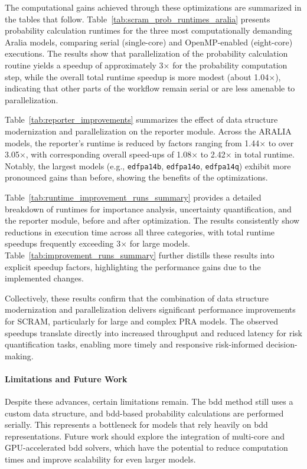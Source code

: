 The computational gains achieved through these optimizations are summarized in the tables that follow. Table~\ref{tab:scram_prob_runtimes_aralia} presents probability calculation runtimes for the three most computationally demanding Aralia models, comparing serial (single-core) and OpenMP-enabled (eight-core) executions. The results show that parallelization of the probability calculation routine yields a speedup of approximately 3$\times$ for the probability computation step, while the overall total runtime speedup is more modest (about 1.04$\times$), indicating that other parts of the workflow remain serial or are less amenable to parallelization.



Table~\ref{tab:reporter_improvements} summarizes the effect of data structure modernization and parallelization on the reporter module. Across the ARALIA models, the reporter's runtime is reduced by factors ranging from 1.44$\times$ to over 3.05$\times$, with corresponding overall speed-ups of 1.08$\times$ to 2.42$\times$ in total runtime. Notably, the largest models (e.g., \texttt{edfpa14b}, \texttt{edfpa14o}, \texttt{edfpa14q}) exhibit more pronounced gains than before, showing the benefits of the optimizations.



Table~\ref{tab:runtime_improvement_runs_summary} provides a detailed breakdown of runtimes for importance analysis, uncertainty quantification, and the reporter module, before and after optimization. The results consistently show reductions in execution time across all three categories, with total runtime speedups frequently exceeding 3$\times$ for large models. Table~\ref{tab:improvement_runs_summary} further distills these results into explicit speedup factors, highlighting the performance gains due to the implemented changes.



Collectively, these results confirm that the combination of data structure modernization and parallelization delivers significant performance improvements for SCRAM, particularly for large and complex PRA models. The observed speedups translate directly into increased throughput and reduced latency for risk quantification tasks, enabling more timely and responsive risk-informed decision-making.



\paragraph{Limitations and Future Work}

Despite these advances, certain limitations remain. The \acrshort{bdd} method still uses a custom data structure, and \acrshort{bdd}-based probability calculations are performed serially. This represents a bottleneck for models that rely heavily on \acrshort{bdd} representations. Future work should explore the integration of multi-core and GPU-accelerated \acrshort{bdd} solvers, which have the potential to reduce computation times and improve scalability for even larger models.

